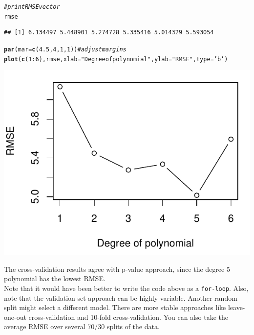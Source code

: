 \documentclass[11pt]{article}\usepackage[]{graphicx}\usepackage[]{color}
\makeatletter
\def\maxwidth{ %
  \ifdim\Gin@nat@width>\linewidth
    \linewidth
  \else
    \Gin@nat@width
  \fi
}
\newcommand{\hlnum}[1]{\textcolor[rgb]{0.686,0.059,0.569}{#1}}%
\newcommand{\hlstr}[1]{\textcolor[rgb]{0.192,0.494,0.8}{#1}}%
\newcommand{\hlcom}[1]{\textcolor[rgb]{0.678,0.584,0.686}{\textit{#1}}}%
\newcommand{\hlopt}[1]{\textcolor[rgb]{0,0,0}{#1}}%
\newcommand{\hlstd}[1]{\textcolor[rgb]{0.345,0.345,0.345}{#1}}%
\newcommand{\hlkwc}[1]{\textcolor[rgb]{0.333,0.667,0.333}{#1}}%
\newcommand{\hlkwd}[1]{\textcolor[rgb]{0.737,0.353,0.396}{\textbf{#1}}}%
\newenvironment{kframe}{%
 \def\at@end@of@kframe{}%
 \ifinner\ifhmode%
  \def\at@end@of@kframe{\end{minipage}}%
  \begin{minipage}{\columnwidth}%
 \fi\fi%
 \def\FrameCommand##1{\hskip\@totalleftmargin \hskip-\fboxsep
 \colorbox{shadecolor}{##1}\hskip-\fboxsep
     \hskip-\linewidth \hskip-\@totalleftmargin \hskip\columnwidth}%
 \MakeFramed {\advance\hsize-\width
   \@totalleftmargin\z@ \linewidth\hsize
   \@setminipage}}%
 {\par\unskip\endMakeFramed%
 \at@end@of@kframe}
\newenvironment{knitrout}{}{} %
\makeatother
\begin{document}
\begin{knitrout}
\color{fgcolor}\begin{kframe}
\begin{alltt}
\hlcom{# print RMSE vector}
\hlstd{rmse}
\end{alltt}
\begin{verbatim}
## [1] 6.134497 5.448901 5.274728 5.335416 5.014329 5.593054
\end{verbatim}
\begin{alltt}
\hlkwd{par}\hlstd{(}\hlkwc{mar}\hlstd{=}\hlkwd{c}\hlstd{(}\hlnum{4.5}\hlstd{,}\hlnum{4}\hlstd{,}\hlnum{1}\hlstd{,}\hlnum{1}\hlstd{))} \hlcom{# adjust margins}
\hlkwd{plot}\hlstd{(}\hlkwd{c}\hlstd{(}\hlnum{1}\hlopt{:}\hlnum{6}\hlstd{), rmse,} \hlkwc{xlab}\hlstd{=}\hlstr{"Degree of polynomial"}\hlstd{,} \hlkwc{ylab}\hlstd{=}\hlstr{"RMSE"}\hlstd{,} \hlkwc{type}\hlstd{=}\hlstr{'b'}\hlstd{)}
\end{alltt}
\end{kframe}
\includegraphics[width=\maxwidth]{figure/unnamed-chunk-9-1} 

\end{knitrout}

The cross-validation results agree with p-value approach, since the degree 5 polynomial has the lowest RMSE.\\ 

Note that it would have been better to write the code above as a \texttt{for-loop}.  Also, note that the validation set approach can be highly variable.  Another random split might select a different model.  There are more stable approaches like leave-one-out cross-validation and 10-fold cross-validation.  You can also take the average RMSE over several 70/30 splits of the data.
\clearpage
\end{document}
